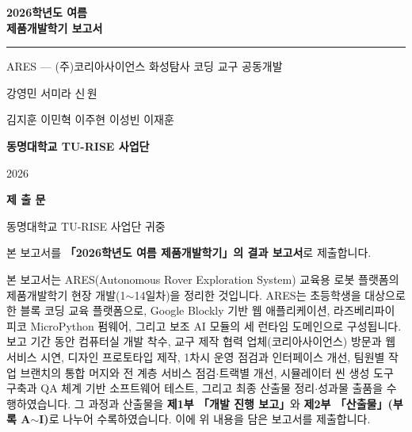 \documentclass[11pt, oneside, openright]{book}
\begin{document}
\frontmatter
\pagestyle{empty}

\begin{titlepage}
  \centering
  \vspace*{0.14\textheight}
  {\sffamily\bfseries\fontsize{34}{42}\selectfont\color{inkdark}%
    2026학년도 여름\\[10pt]제품개발학기 보고서\par}
  \vspace{1.5em}
  {\color{aresorange}\rule{0.52\linewidth}{1.6pt}}\par
  \vspace{1.5em}
  {\sffamily\Large\color{aresorange}%
    ARES --- (주)코리아사이언스 화성탐사 코딩 교구 공동개발\par}
  \vspace{3.6em}
  {\sffamily\large\color{inkdark}%
    강영민 \quad 서미라 \quad 신\,원\par
    \vspace{0.7em}
    김지훈 \quad 이민혁 \quad 이주현 \quad 이성빈 \quad 이재훈\par}
  \vfill
  {\sffamily\LARGE\bfseries\color{deepblue}동명대학교 TU-RISE 사업단\par}
  \vspace{0.7em}
  {\sffamily\normalsize\color{rulegray}2026\par}
  \vspace{0.4\baselineskip}
\end{titlepage}

\null\newpage

\clearpage
\thispagestyle{empty}
\vspace*{0.07\textheight}
\begin{center}
  {\sffamily\bfseries\fontsize{24}{28}\selectfont\color{deepblue}제 \; 출 \; 문}
\end{center}
\vspace{2.6em}

\noindent 동명대학교 TU-RISE 사업단 귀중
\vspace{1.6em}

\noindent 본 보고서를 \textbf{「2026학년도 여름 제품개발학기」의 결과 보고서}로 제출합니다.
\vspace{1.2em}

\noindent 본 보고서는 ARES(Autonomous Rover Exploration System) 교육용 로봇 플랫폼의
제품개발학기 현장 개발(1$\sim$14일차)을 정리한 것입니다. ARES는 초등학생을 대상으로 한
블록 코딩 교육 플랫폼으로, Google Blockly 기반 웹 애플리케이션, 라즈베리파이 피코
MicroPython 펌웨어, 그리고 보조 AI 모듈의 세 런타임 도메인으로 구성됩니다. 보고 기간 동안
컴퓨터실 개발 착수, 교구 제작 협력 업체(코리아사이언스) 방문과 웹 서비스 시연, 디자인
프로토타입 제작, 1차시 운영 점검과 인터페이스 개선, 팀원별 작업 브랜치의 통합 머지와 전
계층 서비스 점검$\cdot$트랙별 개선, 시뮬레이터 씬 생성 도구 구축과 QA 체계 기반 소프트웨어
테스트, 그리고 최종 산출물 정리$\cdot$성과물 출품을 수행하였습니다. 그 과정과 산출물을
\textbf{제1부 「개발 진행 보고」}와 \textbf{제2부 「산출물」(부록 A$\sim$I)}로 나누어
수록하였습니다. 이에 위 내용을 담은 보고서를 제출합니다.
\end{document}
